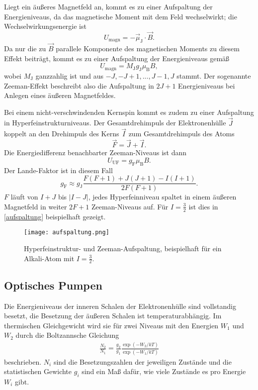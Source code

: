 Liegt ein äußeres Magnetfeld an, kommt es zu einer Aufspaltung der Energieniveaus, da das magnetische Moment mit dem Feld
wechselwirkt; die Wechselwirkungsenergie ist
\begin{equation}
  U_\text{magn} = -\vec{\mu}_\text{J}\cdot\vec{B}.
\end{equation}
Da nur die zu $\vec{B}$ parallele Komponente des magnetischen Moments zu diesem Effekt beiträgt, kommt es zu einer Aufspaltung
der Energieniveaus gemäß
\begin{equation}
  U_\text{magn} = M_\text{J}g_\text{J}\mu_\text{B}B,
\end{equation}
wobei $M_\text{J}$ ganzzahlig ist und aus $-J, -J+1, ..., J-1, J$ stammt. Der sogenannte Zeeman-Effekt beschreibt also die
Aufspaltung in $2J+1$ Energieniveaus bei Anlegen eines äußeren Magnetfeldes.

Bei einem nicht-verschwindenden Kernspin kommt es zudem zu einer Aufspaltung in Hyperfeinstrukturniveaus.
Der Gesamtdrehimpuls der Elektronenhülle $\vec{J}$ koppelt an den Drehimpuls des Kerns $\vec{I}$ zum Gesamtdrehimpuls des Atoms
\begin{equation}
  \vec{F} = \vec{J} + \vec{I}.
\end{equation}
Die Energiedifferenz benachbarter Zeeman-Niveaus ist dann
\begin{equation}
  U_\text{UF} = g_\text{F}\mu_\text{B}B.
\end{equation}
Der Lande-Faktor ist in diesem Fall
\begin{equation}
  g_\text{F} \approx g_\text{J}\frac{F(F+1)+J(J+1)-I(I+1)}{2F(F+1)}.
\end{equation}
$F$ läuft von $I+J$ bis $|I-J|$, jedes Hyperfeinniveau spaltet in einem äußeren Magnetfeld in weiter $2F+1$ Zeeman-Niveaus
auf. Für $I=\frac{3}{2}$ ist dies in \autoref{aufspaltung} beispielhaft gezeigt.
\begin{figure}
  \texttt{[image: aufspaltung.png]}
  \caption{Hyperfeinstruktur- und Zeeman-Aufspaltung, beispielhaft für ein Alkali-Atom mit $I=\frac{3}{2}$.}
  \label{aufspaltung}
\end{figure}

\subsection{Optisches Pumpen}

Die Energieniveaus der inneren Schalen der Elektronenhülle sind vollstandig besetzt, die Besetzung der äußeren Schalen ist
temperaturabhängig. Im thermischen Gleichgewicht wird sie für zwei Niveaus mit den Energien $W_1$ und $W_2$ durch die
Boltzannsche Gleichung
\begin{align}
  \frac{N_2}{N_1} = \frac{g_2}{g_1}\frac{\exp(-W_2/kT)}{\exp(-W_1/kT)}
  \label{boltz}
\end{align}
beschrieben. $N_i$ sind die Besetzungszahlen der jeweiligen Zustände und die statistischen Gewichte $g_i$ sind ein Maß
dafür, wie viele Zustände es pro Energie $W_i$ gibt.

